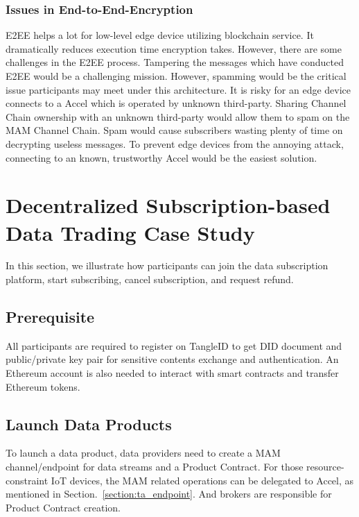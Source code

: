 \documentclass[conference]{IEEEtran}
\begin{document}
\subsubsection{Issues in End-to-End-Encryption}
E2EE helps a lot for low-level edge device utilizing blockchain service. It dramatically reduces execution time encryption takes. However, there are some challenges in the E2EE process. Tampering the messages which have conducted E2EE would be a challenging mission. However, spamming would be the critical issue participants may meet under this architecture. It is risky for an edge device connects to a Accel which is operated by unknown third-party. Sharing Channel Chain ownership with an unknown third-party would allow them to spam on the MAM Channel Chain. Spam would cause subscribers wasting plenty of time on decrypting useless messages. To prevent edge devices from the annoying attack, connecting to an known, trustworthy Accel would be the easiest solution.

\section{Decentralized Subscription-based Data Trading Case Study}
\label{section:trading_model}
In this section, we illustrate how participants can join the data subscription platform, start subscribing, cancel subscription, and request refund.

\subsection{Prerequisite}
All participants are required to register on TangleID to get DID document and public/private key pair for sensitive contents exchange and authentication. An Ethereum account is also needed to interact with smart contracts and transfer Ethereum tokens.

\subsection{Launch Data Products}
To launch a data product, data providers need to create a MAM channel/endpoint for data streams and a Product Contract. For those resource-constraint IoT devices, the MAM related operations can be delegated to Accel, as mentioned in Section.~\ref{section:ta_endpoint}. And brokers are responsible for Product Contract creation. 
\end{document}
